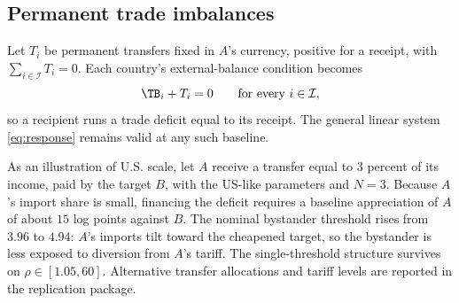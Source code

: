 \subsection{Permanent trade imbalances}
\label{app:online-imbalance}

Let $T_i$ be permanent transfers fixed in $A$'s currency, positive for a receipt, with $\sum_{i\in\mathcal I}T_i=0$. Each country's external-balance condition becomes
\begin{equation*}
\TB_i+T_i=0\qquad\text{for every }i\in\mathcal I,
\end{equation*}
so a recipient runs a trade deficit equal to its receipt. The general linear system \cref{eq:response} remains valid at any such baseline.

As an illustration of U.S. scale, let $A$ receive a transfer equal to 3 percent of its income, paid by the target $B$, with the US-like parameters and $N=3$. Because $A$'s import share is small, financing the deficit requires a baseline appreciation of $A$ of about $15$ log points against $B$. The nominal bystander threshold rises from $3.96$ to $4.94$: $A$'s imports tilt toward the cheapened target, so the bystander is less exposed to diversion from $A$'s tariff. The single-threshold structure survives on $\rho\in[1.05,60]$. Alternative transfer allocations and tariff levels are reported in the replication package.
